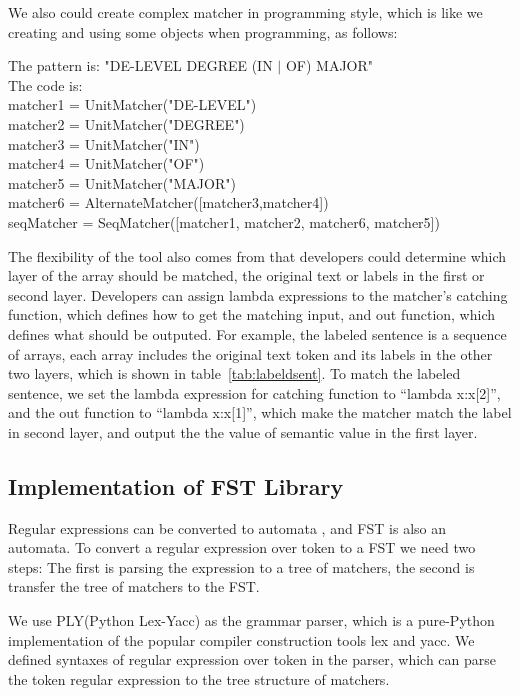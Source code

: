 We also could create complex matcher in programming style, which is like we creating and using some objects when programming, as follows:

\begin{framed}
\small
\noindent
The pattern is:  "DE-LEVEL DEGREE (IN $\vert$ OF) MAJOR" \\
The code is: \\
matcher1 = UnitMatcher("DE-LEVEL") \\
matcher2 = UnitMatcher("DEGREE")  \\
matcher3 = UnitMatcher("IN")   \\
matcher4 = UnitMatcher("OF")   \\
matcher5 = UnitMatcher("MAJOR")  \\
matcher6 = AlternateMatcher([matcher3,matcher4])   \\
seqMatcher = SeqMatcher([matcher1, matcher2, matcher6, matcher5])

\end{framed}

The flexibility of the tool also comes from that developers could determine which layer of the array should be matched, the original text or labels in the first or second layer. Developers can assign lambda expressions to the matcher's catching function, which defines how to get the matching input, and out function, which defines what should be outputed. For example,  the labeled sentence is a sequence of arrays, each array includes the original text token and its labels in the other two layers, which is shown in table~\ref{tab:labeldsent}. To match the labeled sentence, we set the lambda expression for catching function to ``lambda x:x[2]'', and the out function to ``lambda x:x[1]'', which make the matcher match the label in second layer, and output the the value of semantic value in the first layer.


\subsection{Implementation of FST Library}

Regular expressions can be converted to automata \cite{aho1992foundations}, and FST is also an automata. To convert a regular expression over token to a FST we need two steps: The first is parsing the expression to a tree of matchers, the second is transfer the tree of matchers to the FST.

We use PLY(Python Lex-Yacc) as the grammar parser, which is a pure-Python implementation of the popular compiler construction tools lex and yacc. We defined  syntaxes of regular expression over token in the parser, which can parse the token regular expression to the tree structure of matchers.


